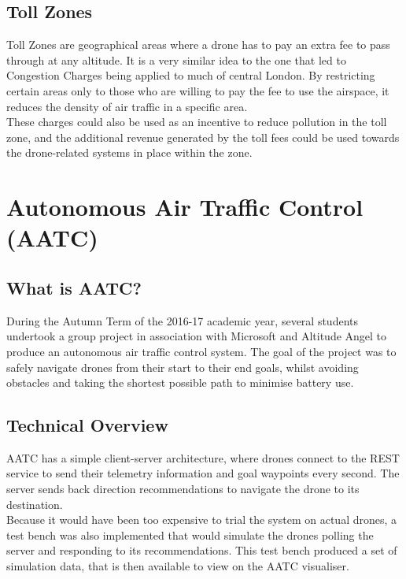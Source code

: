 \documentclass[a4paper,11pt,titlepage]{report}
\begin{document}
\subsection{Toll Zones}
Toll Zones are geographical areas where a drone has to pay an extra fee to pass through at any altitude. It is a very similar idea to the one that led to Congestion Charges being applied to much of central London. By restricting certain areas only to those who are willing to pay the fee to use the airspace, it reduces the density of air traffic in a specific area.\\

These charges could also be used as an incentive to reduce pollution in the toll zone, and the additional revenue generated by the toll fees could be used towards the drone-related systems in place within the zone.

\section{Autonomous Air Traffic Control (AATC)}
\subsection{What is AATC?}
During the Autumn Term of the 2016-17 academic year, several students undertook a group project in association with Microsoft and Altitude Angel to produce an autonomous air traffic control system. The goal of the project was to safely navigate drones from their start to their end goals, whilst avoiding obstacles and taking the shortest possible path to minimise battery use.

\clearpage
\subsection{Technical Overview}
AATC has a simple client-server architecture, where drones connect to the REST service to send their telemetry information and goal waypoints every second. The server sends back direction recommendations to navigate the drone to its destination. \\

Because it would have been too expensive to trial the system on actual drones, a test bench was also implemented that would simulate the drones polling the server and responding to its recommendations. This test bench produced a set of simulation data, that is then available to view on the AATC visualiser. \cite{Balaji2017a}
\end{document}
